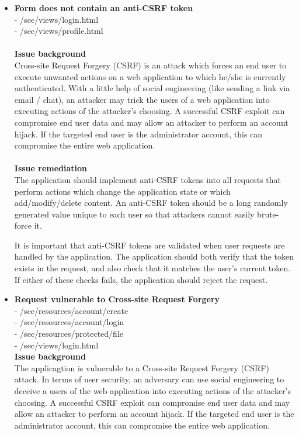 \begin{itemize}
\item \textbf{Form does not contain an anti-CSRF token}\\
- /sec/views/login.html \\
- /sec/views/profile.html \\ \\
\textbf{Issue background} \\
Cross-site Request Forgery (CSRF) is an attack which forces an end user to execute unwanted actions on a web application to which he/she is currently authenticated. With a little help of social engineering (like sending a link via email / chat), an attacker may trick the users of a web application into executing actions of the attacker's choosing. A successful CSRF exploit can compromise end user data and may allow an attacker to perform an account hijack. If the targeted end user is the administrator account, this can compromise the entire web application.\\ \\

\textbf{Issue remediation} \\
The application should implement anti-CSRF tokens into all requests that perform actions which change the application state or which add/modify/delete content. An anti-CSRF token should be a long randomly generated value unique to each user so that attackers cannot easily brute-force it.

It is important that anti-CSRF tokens are validated when user requests are handled by the application. The application should both verify that the token exists in the request, and also check that it matches the user's current token. If either of these checks fails, the application should reject the request. 

\item \textbf{Request vulnerable to Cross-site Request Forgery} \\
- /sec/resources/account/create \\
- /sec/resources/account/login \\
- /sec/resources/protected/file \\
- /sec/views/login.html \\

\textbf{Issue background} \\
The applicagtion is vulnerable to a Cross-site Request Forgery (CSRF) attack. In terms of user security, an adversary can use social engineering to deceive a  users of the web application into executing actions of the attacker's choosing. A successful CSRF exploit can compromise end user data and may allow an attacker to perform an account hijack. If the targeted end user is the administrator account, this can compromise the entire web application. \\


\end{itemize}

